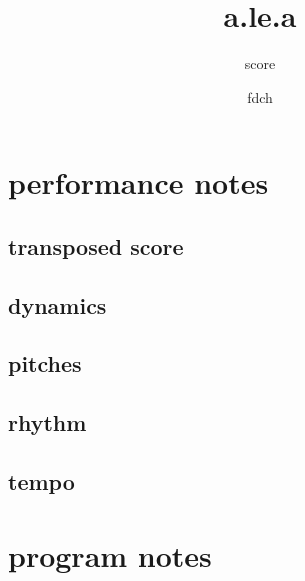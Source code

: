 \documentclass[12pt]{book}
\date{fdch}
\title{a.le.a}
\author{score}
\begin{document}
\maketitle
\begin{multicols}{2}
\section{performance notes}
\subsection{transposed score}

\subsection{dynamics}

\subsection{pitches}

\subsection{rhythm}

\subsection{tempo}

\columnbreak
\section{program notes}

\end{multicols}
\newpage
\end{document}

